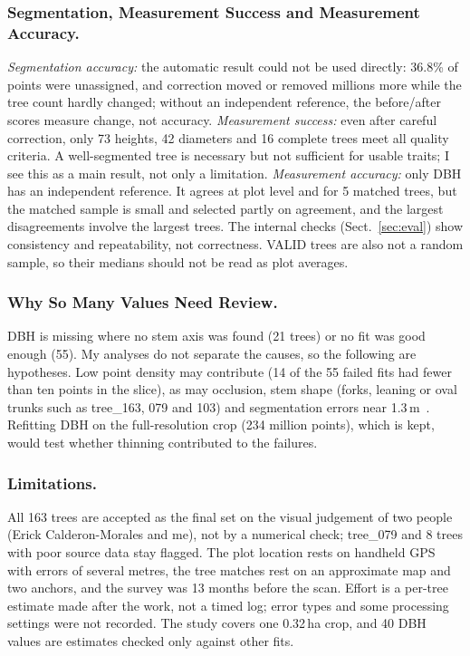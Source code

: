 \documentclass[runningheads]{llncs}
\begin{document}
\subsubsection{Segmentation, Measurement Success and Measurement Accuracy.}
\emph{Segmentation accuracy:} the automatic result could not be used directly: 36.8\% of points were unassigned, and correction moved or removed millions more while the tree count hardly changed; without an independent reference, the before/after scores measure change, not accuracy. \emph{Measurement success:} even after careful correction, only 73 heights, 42 diameters and 16 complete trees meet all quality criteria. A well-segmented tree is necessary but not sufficient for usable traits; I see this as a main result, not only a limitation. \emph{Measurement accuracy:} only DBH has an independent reference. It agrees at plot level and for 5 matched trees, but the matched sample is small and selected partly on agreement, and the largest disagreements involve the largest trees. The internal checks (Sect.~\ref{sec:eval}) show consistency and repeatability, not correctness. VALID trees are also not a random sample, so their medians should not be read as plot averages.

\subsubsection{Why So Many Values Need Review.}
DBH is missing where no stem axis was found (21 trees) or no fit was good enough (55). My analyses do not separate the causes, so the following are hypotheses. Low point density may contribute (14 of the 55 failed fits had fewer than ten points in the slice), as may occlusion, stem shape (forks, leaning or oval trunks such as tree\_163, 079 and 103) and segmentation errors near 1.3\,m~\cite{calders2020,cushman2026}. Refitting DBH on the full-resolution crop (234 million points), which is kept, would test whether thinning contributed to the failures.
\subsubsection{Limitations.}
All 163 trees are accepted as the final set on the visual judgement of two people (Erick Calderon-Morales and me), not by a numerical check; tree\_079 and 8 trees with poor source data stay flagged. The plot location rests on handheld GPS with errors of several metres, the tree matches rest on an approximate map and two anchors, and the survey was 13 months before the scan. Effort is a per-tree estimate made after the work, not a timed log; error types and some processing settings were not recorded. The study covers one 0.32\,ha crop, and 40 DBH values are estimates checked only against other fits.
\end{document}
